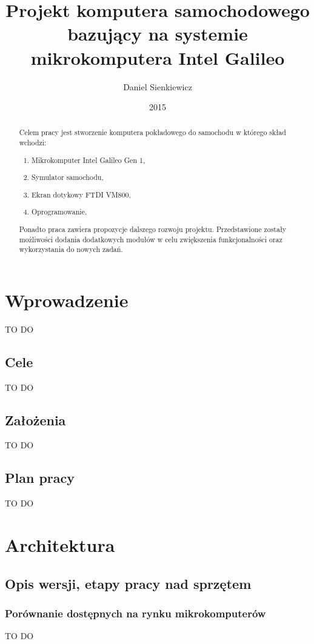 \documentclass{xmgr}
\author   {Daniel Sienkiewicz}
\title    {Projekt komputera samochodowego bazujący na systemie mikrokomputera Intel Galileo}
\date     {2015}
\begin{document}
\begin{abstract}
Celem pracy jest stworzenie komputera pokładowego do samochodu w którego skład wchodzi: \begin{enumerate}
\item Mikrokomputer Intel Galileo Gen 1, 
\item Symulator samochodu, 
\item Ekran dotykowy FTDI VM800, 
\item Oprogramowanie.
\end{enumerate}


Ponadto praca zawiera propozycje dalszego rozwoju projektu. Przedstawione zostały możliwości dodania dodatkowych modułów w celu zwiększenia funkcjonalności oraz wykorzystania do nowych zadań.
\end{abstract}
\maketitle

\chapter{Wprowadzenie}
TO DO
\section{Cele}
TO DO
\section{Założenia}
TO DO
\section{Plan pracy}
TO DO

\chapter{Architektura}
\section{Opis wersji, etapy pracy nad sprzętem}
\subsection{Porównanie dostępnych na rynku mikrokomputerów}
TO DO
\end{document}
